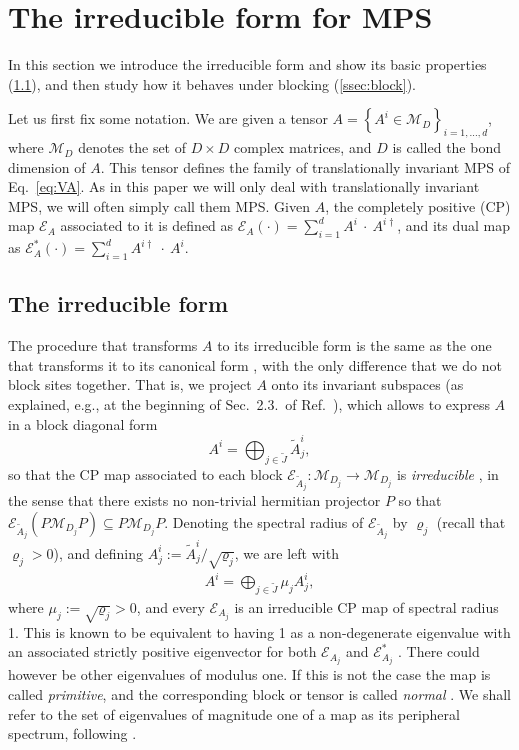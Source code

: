 \documentclass[pra,a4paper,notitlepage,nofootinbib,superscriptaddress]{revtex4-1}
\theoremstyle{plain}
\newcommand{\E}{\mathcal{E}}
\newcommand{\1}{{\openone}}
\newcommand{\be}{\begin{eqnarray}}
\newcommand{\ee}{\end{eqnarray}}
\begin{document}
\section{The irreducible form for MPS}
\label{sec:irr}

In this section we introduce the irreducible form and show its basic properties (\cref{ssec:irr}), and then study how it behaves under blocking (\cref{ssec:block}).



Let us first fix some notation.
We are given a tensor $A = \left\{A^i\in \mathcal{M}_D\right\}_{i=1,\ldots, d}$, where $\mathcal{M}_D$ denotes the set of $D\times D$ complex matrices, and $D$ is called the bond dimension of $A$.
This tensor defines the family of translationally invariant MPS of Eq.\ \eqref{eq:VA}.
As in this paper we will only deal with translationally invariant MPS, we will often simply call them MPS.
Given  $A$,
the completely positive (CP) map $\E_{A}$ associated to it is defined as  $\E_{A}(\cdot) = \sum_{i=1}^d A^i\: \cdot\: A^{i \dagger}$, and its dual map
as $\E^*_{A}(\cdot) = \sum_{i=1}^d  A^{i\dagger} \: \cdot\: A^i$.




\subsection{The irreducible form}
\label{ssec:irr}

The procedure that transforms $A$ to its irreducible form is  the same as the one that transforms it to its canonical form \cite{Ci15},
with the only difference that we do not block sites together.
That is, we   project $A$ onto its invariant subspaces (as explained, e.g., at the beginning of  Sec.\ 2.3.\ of Ref.\ \cite{Ci15}), which allows to express $A$ in a block diagonal form
$$
    A^i=\bigoplus_{j\in\tilde{J}} {\tilde{A}}_j^i ,
$$
so that the CP map associated to each block $\E_{\tilde{A}_j}:\mathcal{M}_{D_j}\rightarrow \mathcal{M}_{D_j}$ is {\it irreducible} \cite{Wo11}, in the sense that
there exists no non-trivial hermitian projector $P$ so that  $\E_{\tilde{A}_j}(P\mathcal{M}_{D_j}P)\subseteq P\mathcal{M}_{D_j}P$.
Denoting  the spectral radius of $\E_{\tilde{A}_j}$ by $\varrho_j$ (recall that $\varrho_j>0$),  and defining $ {A}_j^i :=\tilde{A}^i_j/\sqrt{\varrho_j}$,
we are left with
\be
    \label{eq:irreducible-form}
    A^i = \bigoplus_{j\in \tilde{J}} \mu_j  A_j^i ,
\ee
where $\mu_j := \sqrt{\varrho_j} >0 $, and
every  $\E_{A_j}$ is an irreducible CP map of spectral radius 1. This is known to be equivalent to having 1 as a non-degenerate eigenvalue with an associated strictly positive eigenvector for both $\E_{A_j}$ and  $\E_{A_j}^*$ \cite{Wo11}. There could however be other eigenvalues of modulus one. If this is not the case the map is called \emph{primitive}, and the corresponding block or tensor is called {\it normal} \cite{Ci15}. We shall refer to the set of eigenvalues of magnitude one of a map as its peripheral spectrum, following \cite{Wo11}.
\end{document}
